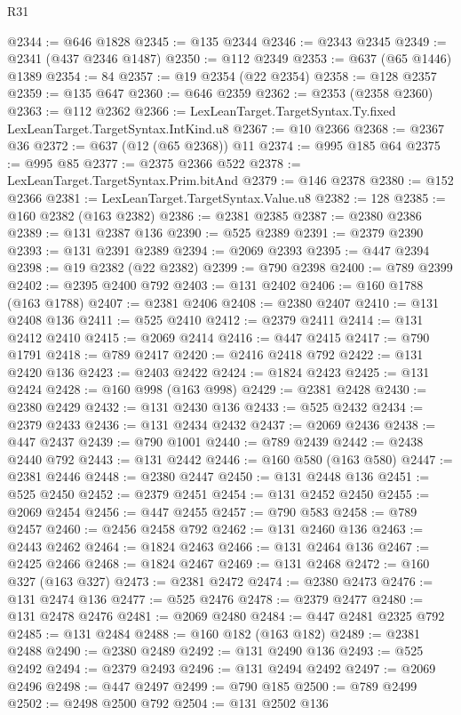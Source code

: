 \begin{lexlean}{R31}
\begin{coremodule}
@2344 := @646 @1828
@2345 := @135 @2344
@2346 := @2343 @2345
@2349 := @2341 (@437 @2346 @1487)
@2350 := @112 @2349
@2353 := @637 (@65 @1446) @1389
@2354 := 84
@2357 := @19 @2354 (@22 @2354)
@2358 := @128 @2357
@2359 := @135 @647
@2360 := @646 @2359
@2362 := @2353 (@2358 @2360)
@2363 := @112 @2362
@2366 := LexLeanTarget.TargetSyntax.Ty.fixed LexLeanTarget.TargetSyntax.IntKind.u8
@2367 := @10 @2366
@2368 := @2367 @36
@2372 := @637 (@12 (@65 @2368)) @11
@2374 := @995 @185 @64
@2375 := @995 @85
@2377 := @2375 @2366 @522
@2378 := LexLeanTarget.TargetSyntax.Prim.bitAnd
@2379 := @146 @2378
@2380 := @152 @2366
@2381 := LexLeanTarget.TargetSyntax.Value.u8
@2382 := 128
@2385 := @160 @2382 (@163 @2382)
@2386 := @2381 @2385
@2387 := @2380 @2386
@2389 := @131 @2387 @136
@2390 := @525 @2389
@2391 := @2379 @2390
@2393 := @131 @2391 @2389
@2394 := @2069 @2393
@2395 := @447 @2394
@2398 := @19 @2382 (@22 @2382)
@2399 := @790 @2398
@2400 := @789 @2399
@2402 := @2395 @2400 @792
@2403 := @131 @2402
@2406 := @160 @1788 (@163 @1788)
@2407 := @2381 @2406
@2408 := @2380 @2407
@2410 := @131 @2408 @136
@2411 := @525 @2410
@2412 := @2379 @2411
@2414 := @131 @2412 @2410
@2415 := @2069 @2414
@2416 := @447 @2415
@2417 := @790 @1791
@2418 := @789 @2417
@2420 := @2416 @2418 @792
@2422 := @131 @2420 @136
@2423 := @2403 @2422
@2424 := @1824 @2423
@2425 := @131 @2424
@2428 := @160 @998 (@163 @998)
@2429 := @2381 @2428
@2430 := @2380 @2429
@2432 := @131 @2430 @136
@2433 := @525 @2432
@2434 := @2379 @2433
@2436 := @131 @2434 @2432
@2437 := @2069 @2436
@2438 := @447 @2437
@2439 := @790 @1001
@2440 := @789 @2439
@2442 := @2438 @2440 @792
@2443 := @131 @2442
@2446 := @160 @580 (@163 @580)
@2447 := @2381 @2446
@2448 := @2380 @2447
@2450 := @131 @2448 @136
@2451 := @525 @2450
@2452 := @2379 @2451
@2454 := @131 @2452 @2450
@2455 := @2069 @2454
@2456 := @447 @2455
@2457 := @790 @583
@2458 := @789 @2457
@2460 := @2456 @2458 @792
@2462 := @131 @2460 @136
@2463 := @2443 @2462
@2464 := @1824 @2463
@2466 := @131 @2464 @136
@2467 := @2425 @2466
@2468 := @1824 @2467
@2469 := @131 @2468
@2472 := @160 @327 (@163 @327)
@2473 := @2381 @2472
@2474 := @2380 @2473
@2476 := @131 @2474 @136
@2477 := @525 @2476
@2478 := @2379 @2477
@2480 := @131 @2478 @2476
@2481 := @2069 @2480
@2484 := @447 @2481 @2325 @792
@2485 := @131 @2484
@2488 := @160 @182 (@163 @182)
@2489 := @2381 @2488
@2490 := @2380 @2489
@2492 := @131 @2490 @136
@2493 := @525 @2492
@2494 := @2379 @2493
@2496 := @131 @2494 @2492
@2497 := @2069 @2496
@2498 := @447 @2497
@2499 := @790 @185
@2500 := @789 @2499
@2502 := @2498 @2500 @792
@2504 := @131 @2502 @136

\end{coremodule}
\end{lexlean}
